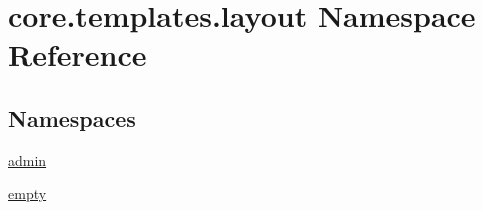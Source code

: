 \hypertarget{namespacecore_1_1templates_1_1layout}{\section{core.\-templates.\-layout Namespace Reference}
\label{namespacecore_1_1templates_1_1layout}
}
\subsection*{Namespaces}
\begin{DoxyCompactItemize}
\item 
\hyperlink{namespacecore_1_1templates_1_1layout_1_1admin}{admin}
\item 
\hyperlink{namespacecore_1_1templates_1_1layout_1_1empty}{empty}
\end{DoxyCompactItemize}
